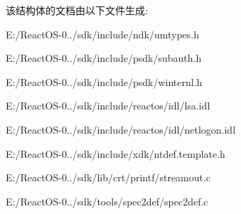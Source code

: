 该结构体的文档由以下文件生成\+:\begin{DoxyCompactItemize}
\item 
E\+:/\+React\+O\+S-\/0../sdk/include/ndk/umtypes.\+h\item 
E\+:/\+React\+O\+S-\/0../sdk/include/psdk/subauth.\+h\item 
E\+:/\+React\+O\+S-\/0../sdk/include/psdk/winternl.\+h\item 
E\+:/\+React\+O\+S-\/0../sdk/include/reactos/idl/lsa.\+idl\item 
E\+:/\+React\+O\+S-\/0../sdk/include/reactos/idl/netlogon.\+idl\item 
E\+:/\+React\+O\+S-\/0../sdk/include/xdk/ntdef.\+template.\+h\item 
E\+:/\+React\+O\+S-\/0../sdk/lib/crt/printf/streamout.\+c\item 
E\+:/\+React\+O\+S-\/0../sdk/tools/spec2def/spec2def.\+c\end{DoxyCompactItemize}
